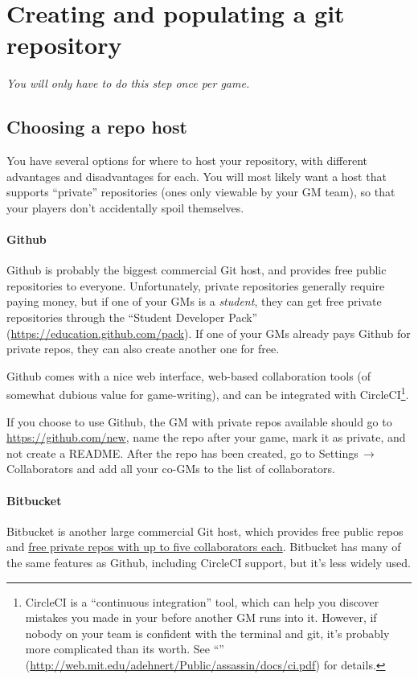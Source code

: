 \documentclass[green]{testgame}
\begin{document}
\section{Creating and populating a git repository}

{\em You will only have to do this step once per game.}

\subsection{Choosing a repo host}

You have several options for where to host your repository, with different advantages and disadvantages for each. You will most likely want a host that supports ``private'' repositories (ones only viewable by your GM team), so that your players don't accidentally spoil themselves.

\paragraph*{Github} Github is probably the biggest commercial Git host, and provides free public repositories to everyone. Unfortunately, private repositories generally require paying money, but if one of your GMs is a \emph{student}, they can get free private repositories through the ``Student Developer Pack'' (\url{https://education.github.com/pack}). If one of your GMs already pays Github for private repos, they can also create another one for free.

Github comes with a nice web interface, web-based collaboration tools (of somewhat dubious value for game-writing), and can be integrated with CircleCI\footnote{CircleCI is a ``continuous integration'' tool, which can help you discover mistakes you made in your \gametex{} before another GM runs into it. However, if nobody on your team is confident with the terminal and git, it's probably more complicated than its worth. See ``\gCI{}'' (\url{http://web.mit.edu/adehnert/Public/assassin/docs/ci.pdf}) for details.}.

If you choose to use Github, the GM with private repos available should go to \url{https://github.com/new}, name the repo after your game, mark it as private, and not create a README. After the repo has been created, go to Settings$\,\to\,$Collaborators and add all your co-GMs to the list of collaborators.

\paragraph*{Bitbucket} Bitbucket is another large commercial Git host, which provides free public repos and \href{https://bitbucket.org/product/pricing/}{free private repos with up to five collaborators each}. Bitbucket has many of the same features as Github, including CircleCI support, but it's less widely used.
\end{document}

